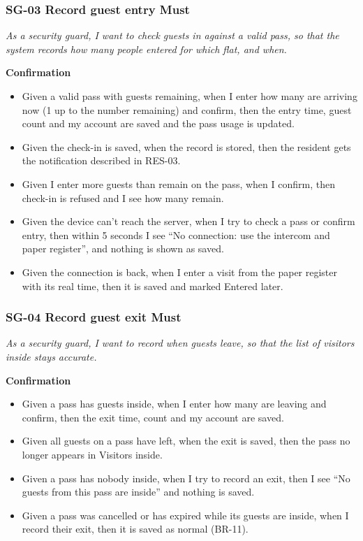 \documentclass[11pt,a4paper]{report}
\begin{document}
\subsubsection*{SG-03 \textperiodcentered{} Record guest entry \textperiodcentered{} Must}

\emph{As a security guard, I want to check guests in against a valid pass, so that the system records how many people entered for which flat, and when.}

\medskip\noindent\textbf{Confirmation}\par

\begin{itemize}
  \item Given a valid pass with guests remaining, when I enter how many are arriving now (1 up to the number remaining) and confirm, then the entry time, guest count and my account are saved and the pass usage is updated.
  \item Given the check-in is saved, when the record is stored, then the resident gets the notification described in RES-03.
  \item Given I enter more guests than remain on the pass, when I confirm, then check-in is refused and I see how many remain.
  \item Given the device can't reach the server, when I try to check a pass or confirm entry, then within 5 seconds I see ``No connection: use the intercom and paper register'', and nothing is shown as saved.
  \item Given the connection is back, when I enter a visit from the paper register with its real time, then it is saved and marked Entered later.
\end{itemize}

\subsubsection*{SG-04 \textperiodcentered{} Record guest exit \textperiodcentered{} Must}

\emph{As a security guard, I want to record when guests leave, so that the list of visitors inside stays accurate.}

\medskip\noindent\textbf{Confirmation}\par

\begin{itemize}
  \item Given a pass has guests inside, when I enter how many are leaving and confirm, then the exit time, count and my account are saved.
  \item Given all guests on a pass have left, when the exit is saved, then the pass no longer appears in Visitors inside.
  \item Given a pass has nobody inside, when I try to record an exit, then I see ``No guests from this pass are inside'' and nothing is saved.
  \item Given a pass was cancelled or has expired while its guests are inside, when I record their exit, then it is saved as normal (BR-11).
\end{itemize}
\end{document}
